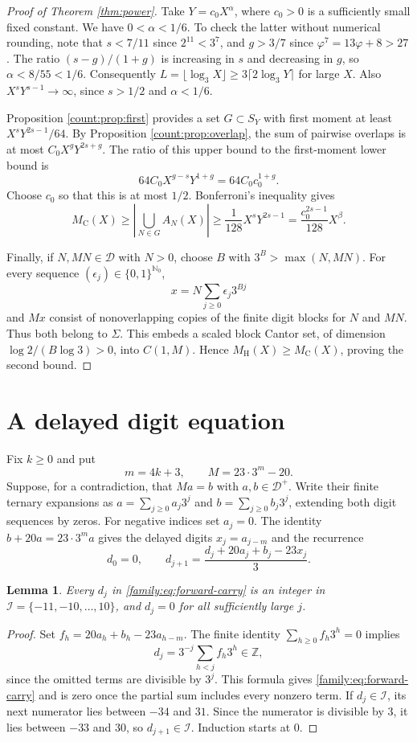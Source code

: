 \documentclass[11pt]{article}
\newtheorem{lemma}[theorem]{Lemma}
\theoremstyle{remark}
\newcommand{\D}{\mathcal D}
\newcommand{\Z}{\mathbb Z}
\newcommand{\N}{\mathbb N}
\newcommand{\MC}{M_{\mathrm C}}
\newcommand{\MH}{M_{\mathrm H}}
\newcommand{\I}{\mathcal I}
\begin{document}
\begin{proof}[Proof of Theorem \ref{thm:power}]
Take $Y=c_0X^\alpha$, where $c_0>0$ is a sufficiently small fixed
constant. We have $0<\alpha<1/6$. To check the latter without numerical
rounding, note that $s<7/11$ since $2^{11}<3^7$, and $g>3/7$ since
$\varphi^7=13\varphi+8>27$. The ratio $(s-g)/(1+g)$ is increasing
in $s$ and decreasing in $g$, so $\alpha<8/55<1/6$.
Consequently $L=\lfloor\log_3X\rfloor\ge3\lceil2\log_3Y\rceil$
for large $X$. Also $X^sY^{s-1}\to\infty$, since $s>1/2$ and
$\alpha<1/6$.

Proposition \ref{count:prop:first} provides a set $G\subset S_Y$ with first
moment at least $X^sY^{2s-1}/64$. By Proposition \ref{count:prop:overlap},
the sum of pairwise overlaps is at most $C_0X^gY^{2s+g}$.
The ratio of this upper bound to the first-moment lower bound is
\[
 64C_0X^{g-s}Y^{1+g}=64C_0c_0^{1+g}.
\]
Choose $c_0$ so that this is at most $1/2$. Bonferroni's inequality gives
\[
 \MC(X)\ge\left|\bigcup_{N\in G}A_N(X)\right|
 \ge\frac1{128}X^sY^{2s-1}
 =\frac{c_0^{2s-1}}{128}X^\beta.
\]

Finally, if $N,MN\in\D$ with $N>0$, choose $B$ with
$3^B>\max(N,MN)$. For every sequence $(\epsilon_j)\in\{0,1\}^{\N_0}$,
\[
 x=N\sum_{j\ge0}\epsilon_j3^{Bj}
\]
and $Mx$ consist of nonoverlapping copies of the finite digit blocks
for $N$ and $MN$. Thus both belong to $\Sigma$. This embeds a scaled
block Cantor set, of dimension $\log2/(B\log3)>0$, into $C(1,M)$.
Hence $\MH(X)\ge\MC(X)$, proving the second bound.
\end{proof}

\section{A delayed digit equation}
Fix $k\ge0$ and put
\[
             m=4k+3,\qquad M=23\cdot3^m-20.
\]
Suppose, for a contradiction, that $Ma=b$ with $a,b\in\D^+$.
Write their finite ternary expansions as
$a=\sum_{j\ge0}a_j3^j$ and $b=\sum_{j\ge0}b_j3^j$, extending both
digit sequences by zeros. For negative indices set $a_j=0$.
The identity $b+20a=23\cdot3^m a$ gives the delayed digits
$x_j=a_{j-m}$ and the recurrence
\begin{equation}\label{family:eq:forward-carry}
 d_0=0,\qquad
 d_{j+1}=\frac{d_j+20a_j+b_j-23x_j}{3}.
\end{equation}

\begin{lemma}\label{family:lem:carry}
Every $d_j$ in \eqref{family:eq:forward-carry} is an integer in
$\I=\{-11,-10,\ldots,10\}$, and $d_j=0$ for all sufficiently
large $j$.
\end{lemma}
\begin{proof}
Set $f_h=20a_h+b_h-23a_{h-m}$. The finite identity
$\sum_{h\ge0}f_h3^h=0$ implies
\[
       d_j=3^{-j}\sum_{h<j}f_h3^h\in\Z,
\]
since the omitted terms are divisible by $3^j$. This formula gives
\eqref{family:eq:forward-carry} and is zero once the partial sum includes
every nonzero term. If $d_j\in\I$, its next numerator lies between
$-34$ and $31$. Since the numerator is divisible by $3$, it lies
between $-33$ and $30$, so $d_{j+1}\in\I$. Induction starts at $0$.
\end{proof}
\end{document}
